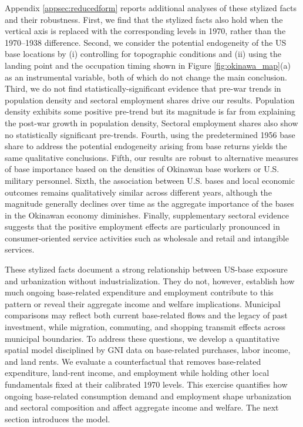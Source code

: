 \documentclass[12pt, unicode, a4paper]{article}
\newcommand{\1}{\mbox{1}\hspace{-0.25em}\mbox{l}} %
\begin{document}
Appendix \ref{appsec:reducedform} reports additional analyses of these stylized facts and their robustness. First, we find that the stylized facts also hold when the vertical axis is replaced with the corresponding levels in 1970, rather than the 1970--1938 difference.
Second, we consider the potential endogeneity of the US base locations by (i) controlling for topographic conditions and (ii) using the landing point and the occupation timing shown in Figure \ref{fig:okinawa_map}(a) as an instrumental variable, both of which do not change the main conclusion.
Third, we do not find statistically-significant evidence that pre-war trends in population density and sectoral employment shares drive our results. Population density exhibits some positive pre-trend but its magnitude is far from explaining the post-war growth in population density, Sectoral employment shares also show no statistically significant pre-trends.
Fourth, using the predetermined 1956 base share to address the potential endogeneity arising from base returns yields the same qualitative conclusions. 
Fifth, our results are robust to alternative measures of base importance based on the densities of Okinawan base workers or U.S. military personnel. 
Sixth, the association between U.S. bases and local economic outcomes remains qualitatively similar across different years, although the magnitude generally declines over time as the aggregate importance of the bases in the Okinawan economy diminishes.
Finally, supplementary sectoral evidence suggests that the positive employment effects are particularly pronounced in consumer-oriented service activities such as wholesale and retail and intangible services. 


These stylized facts document a strong relationship between US-base exposure and urbanization without industrialization. They do not, however, establish how much ongoing base-related expenditure and employment contribute to this pattern or reveal their aggregate income and welfare implications. Municipal comparisons may reflect both current base-related flows and the legacy of past investment, while migration, commuting, and shopping transmit effects across municipal boundaries. To address these questions, we develop a quantitative spatial model disciplined by GNI data on base-related purchases, labor income, and land rents. We evaluate a counterfactual that removes base-related expenditure, land-rent income, and employment while holding other local fundamentals fixed at their calibrated 1970 levels. This exercise quantifies how ongoing base-related consumption demand and employment shape urbanization and sectoral composition and affect aggregate income and welfare. The next section introduces the model.
\end{document}
